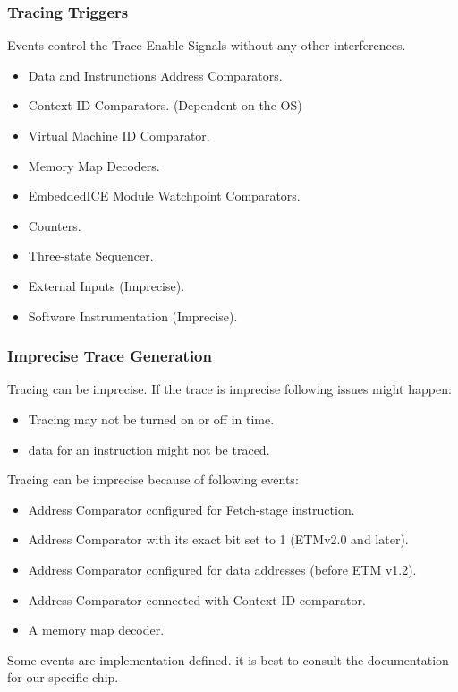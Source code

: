 \documentclass{beamer}
\begin{document}
\begin{frame}
    \frametitle{Tracing Triggers}
    Events control the Trace Enable Signals without any other interferences.
    \begin{itemize}
        \item Data and Instrunctions Address Comparators.
        \item Context ID Comparators. (Dependent on the OS)
        \item Virtual Machine ID Comparator.
        \item Memory Map Decoders.
        \item EmbeddedICE Module Watchpoint Comparators.
        \item Counters.
        \item Three-state Sequencer.
        \item External Inputs (Imprecise).
        \item Software Instrumentation (Imprecise).
    \end{itemize}
\end{frame}

\begin{frame}
    \frametitle{Imprecise Trace Generation}
    Tracing can be imprecise. If the trace is imprecise
    following issues might happen:
    \begin{itemize}
        \item Tracing may not be turned on or off in time.
        \item data for an instruction might not be traced.
    \end{itemize}
    Tracing can be imprecise because of following events:
    \begin{itemize}
        \item Address Comparator configured for Fetch-stage instruction.
        \item Address Comparator with its exact bit set to 1
            (ETMv2.0 and later).
        \item Address Comparator configured for data addresses
            (before ETM v1.2).
        \item Address Comparator connected with Context ID comparator.
        \item A memory map decoder.
    \end{itemize}
    Some events are implementation defined. it is best to consult the
    documentation for our specific chip. \cite{arm2020embedded}
\end{frame}
\end{document}
